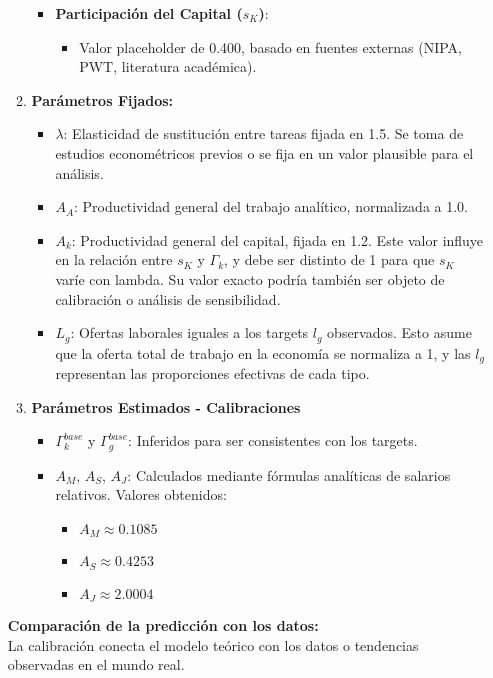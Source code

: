 \documentclass{article}
\theoremstyle{remark}
\theoremstyle{definition}
\begin{document}
\begin{enumerate}
\begin{tcolorbox}[title= Soluci\'on 6]
\begin{enumerate}
\begin{itemize}
        \item \textbf{Participación del Capital ($s_K$)}:
        \begin{itemize}
            \item Valor placeholder de 0.400, basado en fuentes externas (NIPA, PWT, literatura académica).
        \end{itemize}
    \end{itemize}

    \item \textbf{Parámetros Fijados:}
    \begin{itemize}
        \item $\lambda$: Elasticidad de sustitución entre tareas fijada en 1.5. Se toma de estudios econométricos previos o se fija en un valor plausible para el análisis.
        \item $A_A$: Productividad general del trabajo analítico, normalizada a 1.0.
        \item $A_k$: Productividad general del capital, fijada en 1.2. Este valor influye en la relación entre $s_K$ y $\Gamma_k$, y debe ser distinto de 1 para que $s_K$ varíe con lambda. Su valor exacto podría también ser objeto de calibración o análisis de sensibilidad.
        \item $L_g$: Ofertas laborales iguales a los targets $l_g$ observados. Esto asume que la oferta total de trabajo en la economía se normaliza a 1, y las $l_g$ representan las proporciones efectivas de cada tipo.
    \end{itemize}

    \item \textbf{Parámetros Estimados - Calibraciones}
    \begin{itemize}
        \item $\Gamma_k^{base}$ y $\Gamma_g^{base}$: Inferidos para ser consistentes con los targets.
        \item $A_M$, $A_S$, $A_J$: Calculados mediante fórmulas analíticas de salarios relativos. Valores obtenidos:
        \begin{itemize}
            \item $A_M \approx 0.1085$
            \item $A_S \approx 0.4253$
            \item $A_J \approx 2.0004$
        \end{itemize}
    \end{itemize}
\end{enumerate}

\textbf{Comparaci\'on de la predicci\'on con los datos:} \\
La calibración conecta el modelo teórico con los datos o tendencias observadas en el mundo real.


\end{tcolorbox}
\end{enumerate}
\end{document}

